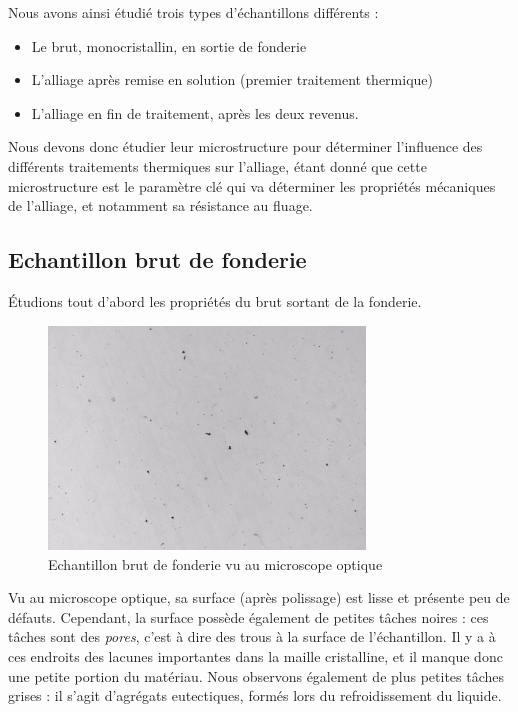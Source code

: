 Nous avons ainsi étudié trois types d'échantillons différents :\\

\begin{itemize}
    \item Le brut, monocristallin, en sortie de fonderie
    \item L'alliage après remise en solution (premier traitement thermique)
    \item L'alliage en fin de traitement, après les deux revenus.\\
\end{itemize}


Nous devons donc étudier leur microstructure pour déterminer l'influence des 
différents traitements thermiques sur l'alliage, étant donné que cette microstructure
est le paramètre clé qui va déterminer les propriétés mécaniques de l'alliage,
et notamment sa résistance au fluage.\\

\subsection*{Echantillon brut de fonderie}

Étudions tout d'abord les propriétés du brut sortant de la fonderie.\\


\begin{figure}[H]
    \centering
    \includegraphics[width=0.75\textwidth]{images_optique/brut2.pdf}
    \caption{Echantillon brut de fonderie vu au microscope optique}
    \label{fig:brut_optique}
\end{figure}


Vu au microscope optique, sa surface (après polissage) est lisse
et présente peu de défauts. Cependant, la surface possède 
également de petites tâches noires : ces tâches sont des \emph{pores},
c'est à dire des trous à la surface de l'échantillon. Il y a à ces endroits 
des lacunes importantes dans la maille cristalline, et il manque donc 
une petite portion du matériau. Nous observons également de plus 
petites tâches grises : il s'agit d'agrégats eutectiques, formés 
lors du refroidissement du liquide.\\



